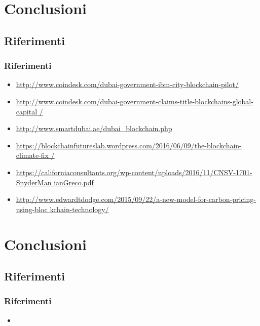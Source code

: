 \section*{Conclusioni}
\subsection*{Riferimenti}
\begin{frame}
  \frametitle{Riferimenti}

  \begin{itemize}
   \item
\url{http://www.coindesk.com/dubai-government-ibm-city-blockchain-pilot/}
\item
\url{
http://www.coindesk.com/dubai-government-claims-title-blockchains-global-capital
/}
\item \url{http://www.smartdubai.ae/dubai_blockchain.php}
\item
\url{
https://blockchainfutureslab.wordpress.com/2016/06/09/the-blockchain-climate-fix
/}
\item
\url{
https://californiaconsultants.org/wp-content/uploads/2016/11/CNSV-1701-SnyderMan
ianGreco.pdf}
\item
\url{
http://www.edwardtdodge.com/2015/09/22/a-new-model-for-carbon-pricing-using-bloc
kchain-technology/}
  \end{itemize}

\end{frame}

\section*{Conclusioni}
\subsection*{Riferimenti}
\begin{frame}
  \frametitle{Riferimenti}

  \begin{itemize}
   \item %
  \end{itemize}

\end{frame}
